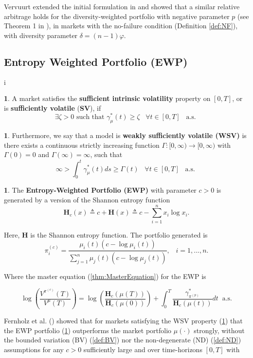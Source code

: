 \documentclass[british]{amsart}
\numberwithin{equation}{section}
\numberwithin{figure}{section}
\theoremstyle{plain}
\theoremstyle{definition}
\newtheorem{defn}[thm]{\protect\definitionname}
\theoremstyle{plain}
\theoremstyle{plain}
\theoremstyle{plain}
\theoremstyle{remark}
\theoremstyle{plain}
\providecommand{\definitionname}{Definition}
\begin{document}
Vervuurt extended the initial formulation in \cite{vervuurt2015} and showed that a similar relative arbitrage holds for the diversity-weighted portfolio with negative parameter $p$ (see Theorem 1 in \cite{vervuurt2015}), in markets with the no-failure condition (Definition \ref{def:NF}), with diversity parameter $\delta=(n-1)\varphi$.

\newpage

\subsection{Entropy Weighted Portfolio (EWP)}
i
\begin{defn}
\label{SV}A market satisfies the \textbf{sufficient intrinsic volatility}
property on $[0,T]$, or is \textbf{sufficiently volatile} (\textbf{SV}),
if
\begin{equation}
\exists\zeta>0\text{ such that }\gamma_{\mu}^{*}(t)\ge\zeta\;\;\;\forall t\in[0,T]\;\;\;\text{a.s. }
\end{equation}
\end{defn}
%
\begin{defn}
\label{WSV}Furthermore, we say that a model is \textbf{weakly sufficiently
volatile (WSV) }is there exists a continuous strictly increasing function
$\Gamma:[0,\infty)\to[0,\infty)$ with $\Gamma(0)=0$ and $\Gamma(\infty)=\infty$,
such that
\begin{equation}
\infty>\int_{0}^{t}\gamma_{\mu}^{*}(t)ds\ge\Gamma(t)\;\;\;\forall t\in[0,T]\;\;\;\text{a.s. }
\end{equation}
\end{defn}
%
\begin{defn}
\label{EWP}The \textbf{Entropy-Weighted Portfolio (EWP) }with parameter
$c>0$ is generated by a version of the Shannon entropy function
\begin{equation}
\mathbf{H}_{c}(x)\triangleq c+\mathbf{H}(x)\triangleq c-\sum_{i=1}^{n}x_{i}\log x_{i}.
\end{equation}

Here, $\mathbf{H}$ is the Shannon entropy function. The portfolio
generated is
\begin{equation}
\pi_{i}^{(c)}=\frac{\mu_{i}(t)(c-\log\mu_{i}(t))}{\sum_{j=1}^{n}\mu_{j}(t)(c-\log\mu_{j}(t))},\;\;\;i=1,...,n.
\end{equation}

Where the master equation (\ref{thm:MasterEquation}) for the EWP
is

\begin{equation}
\log\left(\frac{V^{\pi^{(c)}}(T)}{V^{\mu}(T)}\right)=\log\left(\frac{\mathbf{H}_{c}(\mu(T))}{\mathbf{H}_{c}(\mu(0))}\right)+\int_{0}^{T}\frac{\gamma_{\pi^{(p)}}^{*}}{\mathbf{H}_{c}(\mu(t))}dt\;\;\text{a.s.}
\end{equation}
\end{defn}
Fernholz et al. (\cite{Fernholz2005a}) showed that for markets satisfying
the WSV property (\ref{WSV}) that the EWP portfolio (\ref{EWP})
outperforms the market portfolio $\mu(\cdot)$ strongly, without the
bounded variation (BV) (\ref{def:BV}) nor the non-degenerate (ND)
(\ref{def:ND}) assumptions for any $c>0$ sufficiently large and
over time-horizons $[0,T]$ with
\end{document}
